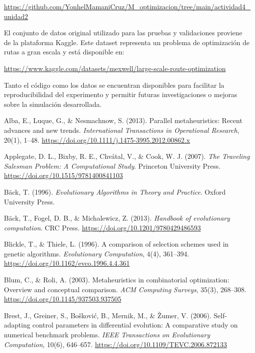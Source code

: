 \documentclass[conference]{IEEEtran}
\begin{document}
\url{https://github.com/YonhelMamaniCruz/M_optimizacion/tree/main/actividad4_unidad2}

El conjunto de datos original utilizado para las pruebas y validaciones proviene de la plataforma Kaggle. Este dataset representa un problema de optimización de rutas a gran escala y está disponible en:

\url{https://www.kaggle.com/datasets/mexwell/large-scale-route-optimization}

Tanto el código como los datos se encuentran disponibles para facilitar la reproducibilidad del experimento y permitir futuras investigaciones o mejoras sobre la simulación desarrollada.






\begin{thebibliography}{99}

Alba, E., Luque, G., \& Nesmachnow, S. (2013). Parallel metaheuristics: Recent advances and new trends. \textit{International Transactions in Operational Research}, 20(1), 1–48. \url{https://doi.org/10.1111/j.1475-3995.2012.00862.x}

Applegate, D. L., Bixby, R. E., Chvátal, V., \& Cook, W. J. (2007). \textit{The Traveling Salesman Problem: A Computational Study}. Princeton University Press. \url{https://doi.org/10.1515/9781400841103}

Bäck, T. (1996). \textit{Evolutionary Algorithms in Theory and Practice}. Oxford University Press.

Bäck, T., Fogel, D. B., \& Michalewicz, Z. (2013). \textit{Handbook of evolutionary computation}. CRC Press. \url{https://doi.org/10.1201/9780429486593}

Blickle, T., \& Thiele, L. (1996). A comparison of selection schemes used in genetic algorithms. \textit{Evolutionary Computation}, 4(4), 361–394. \url{https://doi.org/10.1162/evco.1996.4.4.361}

Blum, C., \& Roli, A. (2003). Metaheuristics in combinatorial optimization: Overview and conceptual comparison. \textit{ACM Computing Surveys}, 35(3), 268–308. \url{https://doi.org/10.1145/937503.937505}

Brest, J., Greiner, S., Bošković, B., Mernik, M., \& Žumer, V. (2006). Self-adapting control parameters in differential evolution: A comparative study on numerical benchmark problems. \textit{IEEE Transactions on Evolutionary Computation}, 10(6), 646–657. \url{https://doi.org/10.1109/TEVC.2006.872133}


\end{thebibliography}
\end{document}
